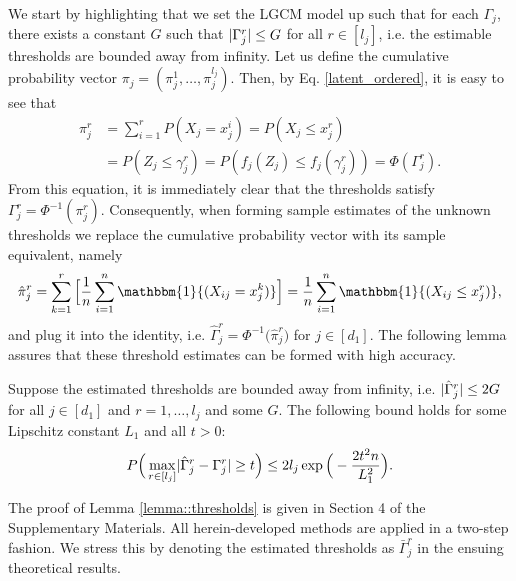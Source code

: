 We start by highlighting that we set the LGCM model up such that for each $\Gamma_j$, there exists a constant $G$ such that $\lvert\Gamma^r_j\rvert \leq G$ for all $r \in [l_{j}]$, i.e. the estimable thresholds are bounded away from infinity. Let us define the cumulative probability vector $\pi_j = (\pi^1_j, \dots, \pi^{l_{j}}_j)$. Then, by Eq. \eqref{latent_ordered}, it is easy to see that
\begin{equation}\label{thresholds_identity}
    \begin{split}
        \pi^r_j &= \sum_{i=1}^r P(X_j = x^i_j) = P(X_j \leq x^r_j) \\
        &= P(Z_j \leq \gamma_j^r) = P(f_j(Z_j) \leq f_j(\gamma_j^r)) = \Phi(\Gamma^r_j).
    \end{split}
\end{equation}
From this equation, it is immediately clear that the thresholds satisfy $\Gamma^{r}_{j} = \Phi^{-1}( \pi^r_j )$. Consequently, when forming sample estimates of the unknown thresholds we replace the cumulative probability vector with its sample equivalent, namely
\begin{equation}
    \hat\pi^r_j = \sum_{k=1}^r \Big[\frac{1}{n} \sum_{i=1}^n \mathbbm{1}{(X_{ij} = x^k_j)}\Big] = \frac{1}{n} \sum_{i=1}^n \mathbbm{1}{(X_{ij} \leq x^r_j)},
\end{equation}
and plug it into the identity, i.e. $\hat\Gamma^r_j = \Phi^{-1}\big( \hat\pi^r_j \big)$ for $j \in [d_1]$. The following lemma assures that these threshold estimates can be formed with high accuracy.
\begin{lemma}\label{lemma::thresholds}
    Suppose the estimated thresholds are bounded away from infinity, i.e. \(\lvert\hat\Gamma^r_j\rvert \leq 2G\) for all $j \in [d_1]$ and $r = 1, \dots, l_j$ and some \(G\). The following bound holds for some Lipschitz constant $L_1$ and all $t > 0$:
    \begin{equation*}
        P\Big( \max_{r\in [l_j]}\Abs{\hat\Gamma_j^r - \Gamma_j^r} \geq t \Big) \leq 2l_{j}\exp{\Big(- \frac{2t^2n}{L_1^2}\Big)}.
    \end{equation*}
\end{lemma}

The proof of Lemma \ref{lemma::thresholds} is given in Section 4 %
of the Supplementary Materials. All herein-developed methods are applied in a two-step fashion. We stress this by denoting the estimated thresholds as $\bar{\Gamma}_j^r$ in the ensuing theoretical results.

